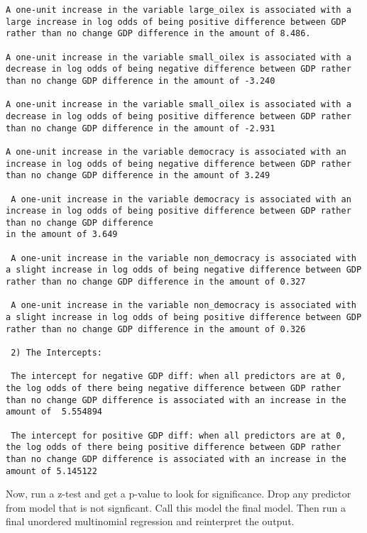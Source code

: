 \documentclass[12pt,letterpaper]{article}
\begin{document}
\begin{enumerate}
\begin{verbatim}
A one-unit increase in the variable large_oilex is associated with a large increase in log odds of being positive difference between GDP rather than no change GDP difference in the amount of 8.486.

A one-unit increase in the variable small_oilex is associated with a decrease in log odds of being negative difference between GDP rather than no change GDP difference in the amount of -3.240

A one-unit increase in the variable small_oilex is associated with a decrease in log odds of being positive difference between GDP rather than no change GDP difference in the amount of -2.931

A one-unit increase in the variable democracy is associated with an increase in log odds of being negative difference between GDP rather than no change GDP difference in the amount of 3.249
 
 A one-unit increase in the variable democracy is associated with an increase in log odds of being positive difference between GDP rather than no change GDP difference 
in the amount of 3.649
 
 A one-unit increase in the variable non_democracy is associated with a slight increase in log odds of being negative difference between GDP rather than no change GDP difference in the amount of 0.327
 
 A one-unit increase in the variable non_democracy is associated with a slight increase in log odds of being positive difference between GDP rather than no change GDP difference in the amount of 0.326
 	
 2) The Intercepts:
 
 The intercept for negative GDP diff: when all predictors are at 0, the log odds of there being negative difference between GDP rather than no change GDP difference is associated with an increase in the amount of  5.554894
 
 The intercept for positive GDP diff: when all predictors are at 0, the log odds of there being positive difference between GDP rather than no change GDP difference is associated with an increase in the amount of 5.145122
 \end{verbatim}

Now, run a z-test and get a p-value to look for significance. Drop any predictor from model that is not signficant. Call this model the final model. Then run a final unordered multinomial regression and reinterpret the output.

	 
	

\end{enumerate}
\end{document}
